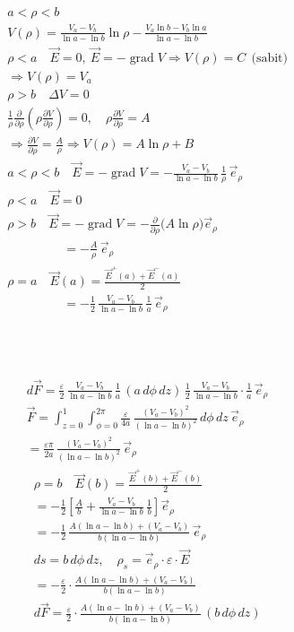 \documentclass[11pt,a4paper]{article}
\begin{document}
\begin{align*}
&a<\rho<b\\
&V(\rho)=\frac{V_a-V_b}{\ln a-\ln b}\ln\rho-\frac{V_a\ln b-V_b\ln a}{\ln a-\ln b}\\
&\rho<a\quad \vec E=0,\ \vec E=-\operatorname{grad}V\Rightarrow V(\rho)=C\ \ \text{(sabit)}\\
&\Rightarrow V(\rho)=V_a\\
&\rho>b\quad \Delta V=0\\
&\frac1\rho\frac{\partial}{\partial\rho}\!\left(\rho\frac{\partial V}{\partial\rho}\right)=0,\quad \rho\frac{\partial V}{\partial\rho}=A\\
&\Rightarrow\frac{\partial V}{\partial\rho}=\frac A\rho\Rightarrow V(\rho)=A\ln\rho+B\\
&a<\rho<b\quad \vec E=-\operatorname{grad}V=-\frac{V_a-V_b}{\ln a-\ln b}\,\frac1\rho\,\vec e_\rho\\
&\rho<a\quad \vec E=0\\
&\rho>b\quad \vec E=-\operatorname{grad}V=-\frac{\partial}{\partial\rho}\bigl(A\ln\rho\bigr)\vec e_\rho\\
&\qquad\qquad\ \ =-\frac A\rho\,\vec e_\rho\\
&\rho=a\quad \vec E(a)=\frac{\vec E^{+}(a)+\vec E^{-}(a)}{2}\\
&\qquad\qquad\ \ =-\frac12\,\frac{V_a-V_b}{\ln a-\ln b}\,\frac1a\,\vec e_\rho
\end{align*}
\begin{center}
\\[2pt]
\\[2pt]
\end{center}
\begin{align*}
&d\vec F=\frac{\varepsilon}{2}\,\frac{V_a-V_b}{\ln a-\ln b}\,\frac1a\,(a\,d\phi\,dz)\,\frac12\,\frac{V_a-V_b}{\ln a-\ln b}\cdot\frac1a\,\vec e_\rho\\
&\vec F=\int_{z=0}^{1}\int_{\phi=0}^{2\pi}\frac{\varepsilon}{4a}\,\frac{(V_a-V_b)^2}{(\ln a-\ln b)^2}\,d\phi\,dz\,\vec e_\rho\\
&=\frac{\varepsilon\pi}{2a}\,\frac{(V_a-V_b)^2}{(\ln a-\ln b)^2}\,\vec e_\rho
\end{align*}
\begin{align*}
&\rho=b\quad \vec E(b)=\frac{\vec E^{+}(b)+\vec E^{-}(b)}{2}\\
&=-\frac12\left[\frac Ab+\frac{V_a-V_b}{\ln a-\ln b}\,\frac1b\right]\vec e_\rho\\
&=-\frac12\,\frac{A(\ln a-\ln b)+(V_a-V_b)}{b(\ln a-\ln b)}\,\vec e_\rho\\
&ds=b\,d\phi\,dz,\quad \rho_s=\vec e_\rho\cdot\varepsilon\cdot\vec E\\
&=-\frac\varepsilon2\cdot\frac{A(\ln a-\ln b)+(V_a-V_b)}{b(\ln a-\ln b)}\\
&d\vec F=\frac\varepsilon2\cdot\frac{A(\ln a-\ln b)+(V_a-V_b)}{b(\ln a-\ln b)}\,(b\,d\phi\,dz)
\end{align*}
\end{document}
